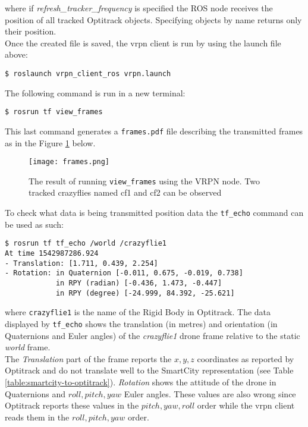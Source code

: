 \noindent where if \textit{refresh\_tracker\_frequency} is specified the ROS node receives the position of all tracked Optitrack objects. Specifying objects by name returns only their position.\\
\noindent Once the created file is saved, the vrpn client is run by using the launch file above:

\begin{mdframed}[backgroundcolor=light-gray, linecolor=light-gray]
\texttt{\$ roslaunch vrpn\_client\_ros vrpn.launch}
\end{mdframed}

\noindent The following command is run in a new terminal:
\begin{mdframed}[backgroundcolor=light-gray, linecolor=light-gray]
\texttt{\$ rosrun tf view\_frames}
\end{mdframed}
\noindent This last command generates a \texttt{frames.pdf} file describing the transmitted frames as in the Figure \ref{figure:ros_vrpn_frames} below.

\begin{figure}[H]
\centering
 \texttt{[image: frames.png]}
 \caption{The result of running \texttt{view\_frames} using the VRPN node. Two tracked crazyflies named cf1 and cf2 can be observed}
 \label{figure:ros_vrpn_frames}
\end{figure}

\noindent To check what data is being transmitted position data the \texttt{tf\_echo} command can be used as such:

\begin{mdframed}[backgroundcolor=light-gray, linecolor=light-gray]
\begin{verbatim}
$ rosrun tf tf_echo /world /crazyflie1
At time 1542987286.924
- Translation: [1.711, 0.439, 2.254]
- Rotation: in Quaternion [-0.011, 0.675, -0.019, 0.738]
            in RPY (radian) [-0.436, 1.473, -0.447]
            in RPY (degree) [-24.999, 84.392, -25.621]
\end{verbatim}
\end{mdframed}

\noindent where \texttt{crazyflie1} is the name of the Rigid Body in Optitrack. The data displayed by \texttt{tf\_echo} shows the translation (in metres) and orientation (in Quaternions and Euler angles) of the \textit{crazyflie1} drone frame relative to the static \textit{world} frame.\\

\noindent The \textit{Translation} part of the frame reports the $x, y, z$ coordinates as reported by Optitrack and do not translate well to the SmartCity representation (see Table \ref{table:smartcity-to-optitrack}). \textit{Rotation} shows the attitude of the drone in Quaternions and $roll, pitch, yaw$ Euler angles. These values are also wrong since Optitrack reports these values in the $pitch, yaw, roll$ order while the vrpn client reads them in the $roll, pitch, yaw$ order.

